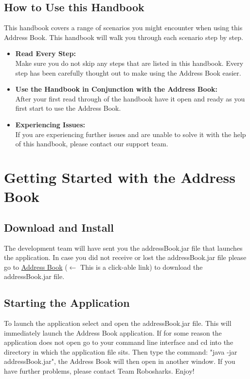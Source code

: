 \documentclass[a4paper, 11pt]{article}
\begin{document}
\subsection{How to Use this Handbook}
This handbook covers a range of scenarios you might encounter when using this Address Book. This handbook will walk you through each scenario step by step.
\begin{itemize}
  \item \textbf{Read Every Step:} \\ Make sure you do not skip any steps that are listed in this handbook. Every step has been carefully thought out to make using the Address Book easier.
  \item \textbf{Use the Handbook in Conjunction with the Address Book:} \\ After your first read through of the handbook have it open and ready as you first start to use the Address Book.
  \item \textbf{Experiencing Issues:} \\ If you are experiencing further issues and are unable to solve it with the help of this handbook, please contact our support team.
\end{itemize}

\clearpage

\section{Getting Started with the Address Book}
\subsection{Download and Install}
The development team will have sent you the addressBook.jar file that launches the application. In case you did not receive or lost the addressBook.jar file please go to \href{https://github.com/WhitmanH/CIS-422-Scheduler}{Address Book} (\(\leftarrow\) This is a click-able link) to download the addressBook.jar file. 
\subsection{Starting the Application}
To launch the application select and open the addressBook.jar file. This will immediately launch the Address Book application. If for some reason the application does not open go to your command line interface and cd into the directory in which the application file sits. Then type the command: "java -jar addressBook.jar", the Address Book will then open in another window. If you have further problems, please contact Team Robosharks. Enjoy!
\end{document}

